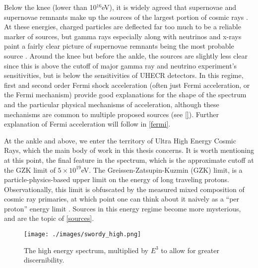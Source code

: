 Below the knee (lower than 10$^{16}$eV), it is widely agreed that supernovae and supernovae remnants make up the sources of the largest portion of cosmic rays \cite{stanev, crapp}. At these energies, charged particles are deflected far too much to be a reliable marker of sources, but gamma rays especially along with neutrinos and x-rays paint a fairly clear picture of supernovae remnants being the most probable source \cite{stanev, sean, foteini}. Around the knee but before the ankle, the sources are slightly less clear since this is above the cutoff of major gamma ray and neutrino experiment's sensitivities, but is below the sensitivities of UHECR detectors. In this regime, first and second order Fermi shock acceleration (often just Fermi acceleration, or the Fermi mechanism) provide good explanations for the shape of the spectrum and the particular physical mechanisms of acceleration, although these mechanisms are common to multiple proposed sources (see \autoref{}). Further explanation of Fermi acceleration will follow in \autoref{fermi}. %

At the ankle and above, we enter the territory of Ultra High Energy Cosmic Rays, which the main body of work in this thesis 
concerns. It is worth mentioning at this point, the final feature in the spectrum, which is the approximate cutoff at the GZK limit of $5\times10^{19}$eV. The Greissen-Zatsupin-Kuzmin (GZK) limit, is a particle-physics-based upper limit on the energy of long traveling protons. Observationally, this limit is obfuscated by the measured mixed composition of cosmic ray primaries, at which point one can think about it naively as a ``per proton'' energy limit \cite{futuregzk}. Sources in this energy regime become more mysterious, and are the topic of \autoref{sources}. 
\begin{figure}[h!]
\begin{center}
\texttt{[image: ./images/swordy\_high.png]}
\begin{singlespace}
\caption[High Energy All Particle Spectrum]{The high energy spectrum, multiplied by $E^3$ to allow for greater discernibility.}
\end{singlespace}
\label{swordyhigh}
\end{center}
\end{figure}
